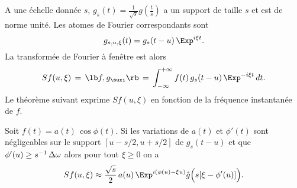 A une \'{e}chelle donn\'{e}e $s$,
$g_s	(t)	= \frac	1 {\sqrt s}	g(\frac	t s)$ a un support de taille $s$ 
et est de norme unit\'{e}. Les atomes de Fourier correspondants sont
\[
g_{s,u,\xi} (t) = g_s (t-u) \, \Exp^{i \xi t} .
\]
La transform\'{e}e de Fourier \`a fen\^{e}tre est alors
\begin{equation}
\label{scale-wind-Four}
Sf(u,\xi) \,=\, \lb f,g_\suxi \rb \, =\,
\int_{-\infty}^{+\infty} f(t)\, g_s (t-u)\, \Exp^{-i\xi t} \,dt.
\end{equation}
Le th\'{e}or\`{e}me suivant exprime $Sf(u,\xi)$ en fonction de la 
fr\'{e}quence instantan\'{e}e de $f$.

\begin{theorem}
\label{approx-window}
Soit $f(t) = a(t)\, \cos \phi (t)$.
Si les variations de $a(t)$ et $\phi'(t)$ sont
n\'egligeables sur le support $[u-s/2,u+s/2]$
de $g_s(t-u)$ et que $\phi'(u) \geq s^{-1} \, \Delta {\omega}$
alors pour tout $\xi \geq 0$ on a
\begin{equation}
\label{wt-est}
Sf(u,\xi) 
\approx \frac {\sqrt s} 2  \,a(u)\,\Exp^{ i (\phi(u) - \xi u)}
\hat g\Bigl(s[\xi - \phi'(u)]\Bigr) .
\end{equation}
\end{theorem}

